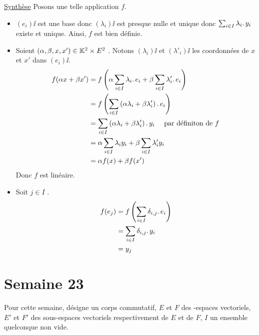 \documentclass{article}
\renewenvironment{question_kholle}[2][ ]
{
	\subsection{\texorpdfstring{#2}{}}
	\notblank{#1}
	{
		\noindent #1
		\bigbreak
	}
	{}
	\begin{proof}
}
{
	\end{proof}
}
\begin{document}
\begin{question_kholle}
		\noindent \underline{Synthèse} Posons une telle application $f$. \\
		\begin{itemize}
			\item $(e_i)\ii$ est une base donc $(\lambda_i)\ii$ est presque nulle et unique donc $\sum_{i \in I} \lambda_i \ldotp y_i$ existe et unique.
			Ainsi, $f$ est bien définie.
			\item Soient $(\alpha, \beta, x, x') \in \mathbb K^2 \times E^2$ \fqs. Notons $(\lambda_i)\ii$ et $(\lambda'_i)\ii$ les coordonnées de $x$ et $x'$ dans $(e_i)\ii$.
			\begin{equation*}
				\begin{aligned}
					f( \alpha x + \beta x' )
					&= f\left( \alpha \sum_{i \in I} \lambda_i \ldotp e_i + \beta \sum_{i \in I} \lambda'_i \ldotp e_i \right) \\
					&= f\left( \sum_{i \in I} \left( \alpha \lambda_i + \beta \lambda'_i \right) \ldotp e_i \right) \\
					&= \sum_{i \in I} \left( \alpha \lambda_i + \beta \lambda'_i \right) \ldotp y_i \quad \text{ par définiton de } f \\
					&= \alpha \sum_{i \in I} \lambda_i y_i + \beta \sum_{i \in I} \lambda'_i y_i \\
					&= \alpha f(x) + \beta f(x')
				\end{aligned}
			\end{equation*}
			Donc $f$ est linéaire.
			\item Soit $j \in I$ \fq.
			\begin{equation*}
				\begin{aligned}
					f(e_j)
					&= f \left(\sum_{i \in I} \delta_{i,j} \ldotp e_i \right) \\
					&= \sum_{i \in I} \delta_{i,j} \ldotp y_i \\
					&= y_j
				\end{aligned}
			\end{equation*}
		\end{itemize}
	\end{question_kholle}

\pagebreak\section{Semaine 23}

	Pour cette semaine, \K désigne un corps commutatif, $E$ et $F$ des \K\!\!-espaces vectoriels, $E'$ et $F'$ des sous-espaces vectoriels respectivement de $E$ et de $F$, $I$ un ensemble quelconque non vide.
\end{document}
